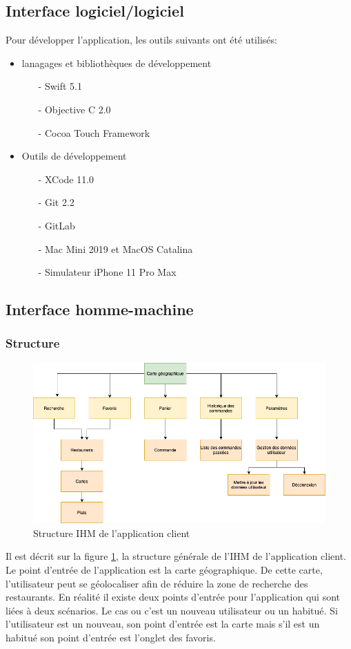 \subsection{Interface logiciel/logiciel}
Pour développer l'application, les outils suivants ont été utilisés:
\begin{itemize}
	\item lanagages et bibliothèques de développement 
	\begin{itemize}
		\item[-] Swift 5.1
		\item[-] Objective C 2.0
		\item[-] Cocoa Touch Framework 
	\end{itemize}
	\item Outils de développement
	\begin{itemize}
		\item[-] XCode 11.0
		\item[-] Git 2.2
		\item[-] GitLab
		\item[-] Mac Mini 2019 et MacOS Catalina
		\item[-] Simulateur iPhone 11 Pro Max
	\end{itemize}
\end{itemize}

\subsection{Interface homme-machine}
\subsubsection*{Structure}
\begin{figure}[H]
	\centering
	\includegraphics[scale=0.5]{assets/images/ihm_structure.png}
	\caption{Structure \gls{IHM} de l'application client}
	\label{fig.16}
\end{figure}
Il est décrit sur la figure \ref{fig.16}, la structure générale de l'\gls{IHM} de l'application client. Le point d'entrée de l'application est la carte géographique. De cette carte, l'utilisateur peut se géolocaliser afin de réduire la zone de recherche des restaurants. En réalité il existe deux points d'entrée pour l'application qui sont liées à deux scénarios. Le cas ou c'est un nouveau utilisateur ou un habitué. Si l'utilisateur est un nouveau, son point d'entrée est la carte mais s'il est un habitué son point d'entrée est l'onglet des favoris. 

